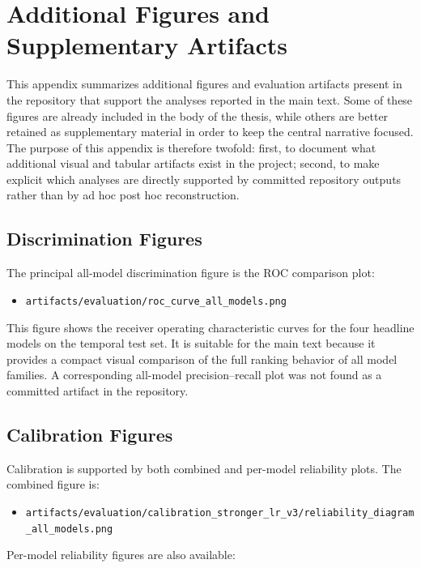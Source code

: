 \chapter{Additional Figures and Supplementary Artifacts}

This appendix summarizes additional figures and evaluation artifacts present in the repository that support the analyses reported in the main text. Some of these figures are already included in the body of the thesis, while others are better retained as supplementary material in order to keep the central narrative focused. The purpose of this appendix is therefore twofold: first, to document what additional visual and tabular artifacts exist in the project; second, to make explicit which analyses are directly supported by committed repository outputs rather than by ad hoc post hoc reconstruction.

\section{Discrimination Figures}

The principal all-model discrimination figure is the ROC comparison plot:

\begin{itemize}
    \item \texttt{artifacts/evaluation/roc\_curve\_all\_models.png}
\end{itemize}

This figure shows the receiver operating characteristic curves for the four headline models on the temporal test set. It is suitable for the main text because it provides a compact visual comparison of the full ranking behavior of all model families. A corresponding all-model precision--recall plot was not found as a committed artifact in the repository.

\section{Calibration Figures}

Calibration is supported by both combined and per-model reliability plots. The combined figure is:

\begin{itemize}
    \item \texttt{artifacts/evaluation/calibration\_stronger\_lr\_v3/reliability\_diagram\_all\_models.png}
\end{itemize}

Per-model reliability figures are also available:

